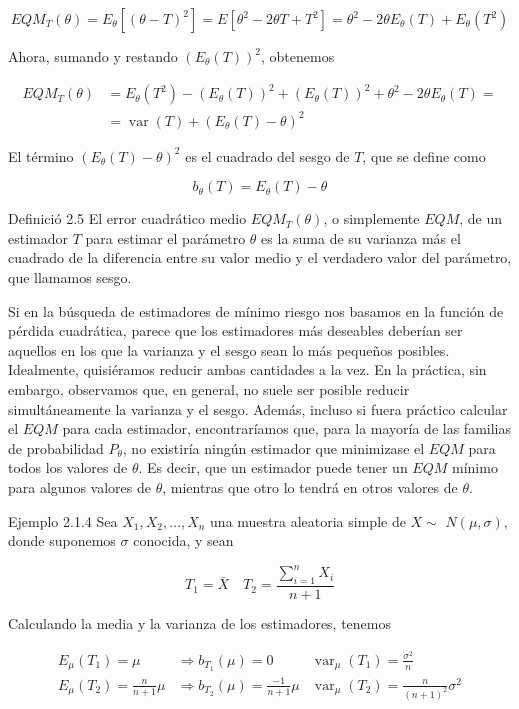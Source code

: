 \documentclass[
]{article}
\begin{document}
\[
E Q M_{T}(\theta)=E_{\theta}\left[(\theta-T)^{2}\right]=E\left[\theta^{2}-2 \theta T+T^{2}\right]=\theta^{2}-2 \theta E_{\theta}(T)+E_{\theta}\left(T^{2}\right)
\]

Ahora, sumando y restando \(\left(E_{\theta}(T)\right)^{2}\), obtenemos

\[
\begin{aligned}
E Q M_{T}(\theta) & =E_{\theta}\left(T^{2}\right)-\left(E_{\theta}(T)\right)^{2}+\left(E_{\theta}(T)\right)^{2}+\theta^{2}-2 \theta E_{\theta}(T)= \\
& =\operatorname{var}(T)+\left(E_{\theta}(T)-\theta\right)^{2}
\end{aligned}
\]

El término \(\left(E_{\theta}(T)-\theta\right)^{2}\) es el cuadrado del sesgo de \(T\), que se define como

\[
b_{\theta}(T)=E_{\theta}(T)-\theta
\]

Definició 2.5 El error cuadrático medio \(E Q M_{T}(\theta)\), o simplemente \(E Q M\), de un estimador \(T\) para estimar el parámetro \(\theta\) es la suma de su varianza más el cuadrado de la diferencia entre su valor medio y el verdadero valor del parámetro, que llamamos sesgo.

Si en la búsqueda de estimadores de mínimo riesgo nos basamos en la función de pérdida cuadrática, parece que los estimadores más deseables deberían ser aquellos en los que la varianza y el sesgo sean lo más pequeños posibles. Idealmente, quisiéramos reducir ambas cantidades a la vez. En la práctica, sin embargo, observamos que, en general, no suele ser posible reducir simultáneamente la varianza y el sesgo. Además, incluso si fuera práctico calcular el \(E Q M\) para cada estimador, encontraríamos que, para la mayoría de las familias de probabilidad \(P_{\theta}\), no existiría ningún estimador que minimizase el \(E Q M\) para todos los valores de \(\theta\). Es decir, que un estimador puede tener un \(E Q M\) mínimo para algunos valores de \(\theta\), mientras que otro lo tendrá en otros valores de \(\theta\).

Ejemplo 2.1.4 Sea \(X_{1}, X_{2}, \ldots, X_{n}\) una muestra aleatoria simple de \(X \sim\) \(N(\mu, \sigma)\), donde suponemos \(\sigma\) conocida, y sean

\[
T_{1}=\bar{X} \quad T_{2}=\frac{\sum_{i=1}^{n} X_{i}}{n+1}
\]

Calculando la media y la varianza de los estimadores, tenemos

\[
\begin{array}{lll}
E_{\mu}\left(T_{1}\right)=\mu & \Rightarrow b_{T_{1}}(\mu)=0 & \operatorname{var}_{\mu}\left(T_{1}\right)=\frac{\sigma^{2}}{n} \\
E_{\mu}\left(T_{2}\right)=\frac{n}{n+1} \mu & \Rightarrow b_{T_{2}}(\mu)=\frac{-1}{n+1} \mu & \operatorname{var}_{\mu}\left(T_{2}\right)=\frac{n}{(n+1)^{2}} \sigma^{2}
\end{array}
\]
\end{document}
